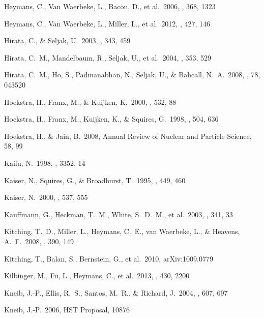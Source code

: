 \documentclass[apj]{emulateapj}
\begin{document}
\begin{thebibliography}{}
   Heymans, C., Van
Waerbeke, L., Bacon, D., et al.\ 2006, \mnras, 368, 1323

  Heymans, C., Van
  Waerbeke, L., Miller, L., et al.\ 2012, \mnras, 427, 146

  Hirata, C., \& Seljak, U.\ 2003, \mnras, 343, 459
  
  Hirata, C.~M., 
Mandelbaum, R., Seljak, U., et al.\ 2004, \mnras, 353, 529 

  Hirata, C.~M., Ho, S.,
  Padmanabhan, N., Seljak, U., \& Bahcall, N.~A.\ 2008, \prd, 78, 043520

  Hoekstra, H., Franx,
M., \& Kuijken, K.\ 2000, \apj, 532, 88

  Hoekstra, H., Franx,
  M., Kuijken, K., \& Squires, G.\ 1998, \apj, 504, 636

  Hoekstra, H.,
  \& Jain, B.\ 2008, Annual Review of Nuclear and Particle Science, 58, 99

  Kaifu, N.\ 1998, \procspie,
  3352, 14

  Kaiser, N., Squires, G.,
   \& Broadhurst, T.\ 1995, \apj, 449, 460

   Kaiser, N.\ 2000, \apj, 537,
555

 Kauffmann, G.,
Heckman, T.~M., White, S.~D.~M., et al.\ 2003, \mnras, 341, 33

  Kitching, T.~D.,
  Miller, L., Heymans, C.~E., van Waerbeke, L.,
  \& Heavens, A.~F.\ 2008, \mnras, 390, 149

  Kitching, T., Balan,
S., Bernstein, G., et al.\ 2010, arXiv:1009.0779

  Kilbinger, M., Fu,
  L., Heymans, C., et al.\ 2013, \mnras, 430, 2200

  Kneib, J.-P., Ellis,
  R.~S., Santos, M.~R., \& Richard, J.\ 2004, \apj, 607, 697

  Kneib, J.-P.\ 2006, HST
  Proposal, 10876


\end{thebibliography}
\end{document}
